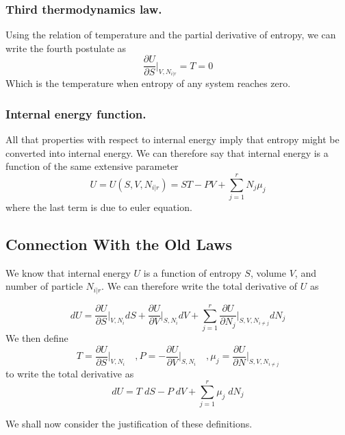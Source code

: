 \documentclass[../../../Main.tex]{subfiles}
\begin{document}
\subsubsection*{Third thermodynamics law.} Using the relation of temperature and the partial derivative of entropy, we can write the fourth postulate as 
\begin{equation*}
    \frac{\partial U}{\partial S}\bigg|_{V,N_{i|r}}=T=0
\end{equation*} 
Which is the temperature when entropy of any system reaches zero.

\subsubsection*{Internal energy function.} All that properties with respect to internal energy imply that entropy might be converted into internal energy. We can therefore say that internal energy is a function of the same extensive parameter
\begin{equation*}
    U=U(S,V,N_{i|r})=ST-PV+\sum_{j=1}^{r}N_j\mu_j
\end{equation*}
where the last term is due to euler equation.

\subsection*{Connection With the Old Laws}
We know that internal energy \(U\) is a function of entropy \(S \), volume \(V\), and number of particle \(N_{i|r}\). We can therefore write the total derivative of \(U\) as

\begin{equation*}
    dU=\frac{\partial U}{\partial S}\bigg|_{V,N_i} dS + \frac{ \partial U}{\partial V}\bigg|_{S,N_i} dV+ \sum_{j=1 }^{r}\frac{\partial U}{\partial N_j}\bigg|_{S,V,N_{i\neq j}}dN_j
\end{equation*} 
We then define 
\begin{equation*} 
    T=\frac{\partial U}{\partial S}\bigg|_{V, N_{i} }\quad 
    ,P=-\frac{\partial U}{\partial V}\bigg|_{S, N_{i} }\quad 
    ,\mu_j=\frac{\partial U}{\partial N}\bigg|_{S, V, N_{i\neq j} } 
\end{equation*} 
to write the total derivative as 
\begin{equation*} 
    dU=T\;dS-P\;dV+ \sum_{j=1 }^{r}\mu_j \; dN_j 
\end{equation*} 

We shall now consider the justification of these definitions.
\end{document}
